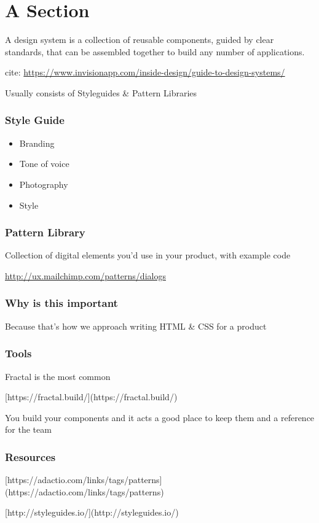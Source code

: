 \section{A Section}

A design system is a collection of reusable components, guided by clear standards, that can be assembled together to build any number of applications.

cite: \href{https://www.invisionapp.com/inside-design/guide-to-design-systems/}{https://www.invisionapp.com/inside-design/guide-to-design-systems/}

Usually consists of Styleguides \& Pattern Libraries

\subsubsection{Style Guide}

\begin{itemize}
    \item Branding
    \item Tone of voice
    \item Photography
    \item Style
\end{itemize}


\subsubsection{Pattern Library}

Collection of digital elements you’d use in your product, with example code

\href{http://ux.mailchimp.com/patterns/dialogs}{http://ux.mailchimp.com/patterns/dialogs}


\subsubsection{Why is this important}

Because that's how we approach writing HTML \& CSS for a product

\subsubsection{Tools}

Fractal is the most common

[https://fractal.build/](https://fractal.build/)

You build your components and it acts a good place to keep them and a reference for the team


\subsubsection{Resources}

[https://adactio.com/links/tags/patterns](https://adactio.com/links/tags/patterns)

[http://styleguides.io/](http://styleguides.io/)

